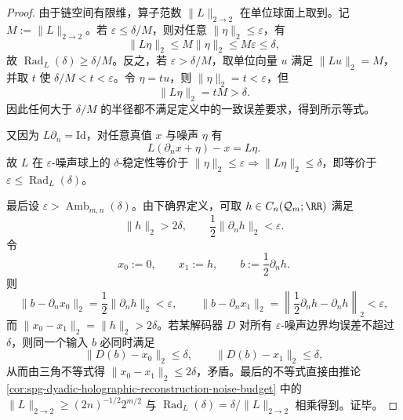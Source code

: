 \begin{proof}
由于链空间有限维，算子范数 \(\|L\|_{2\to2}\) 在单位球面上取到。记 \(M:=\|L\|_{2\to2}\)。若 \(\varepsilon\le\delta/M\)，则对任意 \(\|\eta\|_2\le\varepsilon\)，有
\[
\|L\eta\|_2\le M\|\eta\|_2\le M\varepsilon\le\delta,
\]
故 \(\operatorname{Rad}_L(\delta)\ge\delta/M\)。反之，若 \(\varepsilon>\delta/M\)，取单位向量 \(u\) 满足 \(\|Lu\|_2=M\)，并取 \(t\) 使 \(\delta/M<t<\varepsilon\)。令 \(\eta=tu\)，则 \(\|\eta\|_2=t<\varepsilon\)，但
\[
\|L\eta\|_2=tM>\delta.
\]
因此任何大于 \(\delta/M\) 的半径都不满足定义中的一致误差要求，得到所示等式。

又因为 \(L\partial_n=\mathrm{Id}\)，对任意真值 \(x\) 与噪声 \(\eta\) 有
\[
L(\partial_nx+\eta)-x=L\eta.
\]
故 \(L\) 在 \(\varepsilon\)-噪声球上的 \(\delta\)-稳定性等价于 \(\|\eta\|_2\le\varepsilon\Rightarrow \|L\eta\|_2\le\delta\)，即等价于 \(\varepsilon\le\operatorname{Rad}_L(\delta)\)。

最后设 \(\varepsilon>\operatorname{Amb}_{m,n}(\delta)\)。由下确界定义，可取 \(h\in C_n(\mathcal Q_m;\RR)\) 满足
\[
\|h\|_2>2\delta,\qquad \frac12\|\partial_nh\|_2<\varepsilon.
\]
令
\[
x_0:=0,\qquad x_1:=h,\qquad b:=\frac12\partial_nh.
\]
则
\[
\|b-\partial_nx_0\|_2=\frac12\|\partial_nh\|_2<\varepsilon,\qquad
\|b-\partial_nx_1\|_2=\left\|\frac12\partial_nh-\partial_nh\right\|_2<\varepsilon,
\]
而 \(\|x_0-x_1\|_2=\|h\|_2>2\delta\)。若某解码器 \(D\) 对所有 \(\varepsilon\)-噪声边界均误差不超过 \(\delta\)，则同一个输入 \(b\) 必同时满足
\[
\|D(b)-x_0\|_2\le\delta,\qquad \|D(b)-x_1\|_2\le\delta,
\]
从而由三角不等式得 \(\|x_0-x_1\|_2\le2\delta\)，矛盾。最后的不等式直接由推论 \ref{cor:spg-dyadic-holographic-reconstruction-noise-budget} 中的 \(\|L\|_{2\to2}\ge(2n)^{-1/2}2^{m/2}\) 与 \(\operatorname{Rad}_L(\delta)=\delta/\|L\|_{2\to2}\) 相乘得到。证毕。
\end{proof}


